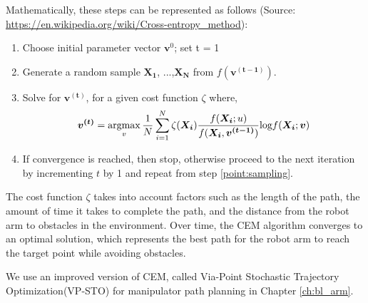 Mathematically, these steps can be represented as follows (Source: \url{https://en.wikipedia.org/wiki/Cross-entropy_method}):

\begin{enumerate}
    \item Choose initial parameter vector $\boldsymbol{v}^{0}$; set t = 1
    \item \label{point:sampling}Generate a random sample $\boldsymbol{X_1}$, ...,$\boldsymbol{X_N}$ from $f(\boldsymbol{v^{(t-1)}})$.
    \item Solve for $\boldsymbol{v^{(t)}}$, for a given cost function $\zeta$ where,
    \begin{equation}
        \boldsymbol{v^{(t)}} = \operatorname*{argmax}_v\frac{1}{N}\sum_{i=1}^{N}\zeta(\boldsymbol{X_i})\frac{f(\boldsymbol{X_i};u)}{f(\boldsymbol{X_i},\boldsymbol{v^{(t-1)}})}\text{log}f(\boldsymbol{X_i};\boldsymbol{v})
    \end{equation}
    \item If convergence is reached, then stop, otherwise proceed to the next iteration by incrementing $t$ by 1 and repeat from step \ref{point:sampling}.
\end{enumerate}

The cost function $\zeta$ takes into account factors such as the length of the path, the amount of time it takes to complete the path, and the distance from the robot arm to obstacles in the environment. Over time, the CEM algorithm converges to an optimal solution, which represents the best path for the robot arm to reach the target point while avoiding obstacles. 

We use an improved version of CEM, called Via-Point Stochastic Trajectory Optimization(VP-STO)\cite{VPSTO} for manipulator path planning in Chapter \ref{ch:bl_arm}.